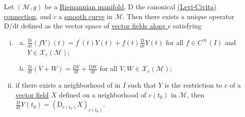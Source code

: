 \begin{proposition}\label{prop:covariant-derivative}
	Let \((\mathcal{M} , g)\) be a \hyperref[def:Riemannian-manifold]{Riemannian manifold}, \(\mathrm{D}\) the canonical \hyperref[def:Levi-Civita-connection]{(Levi-Civita) connection}, and \(c\) a \hyperref[def:curve]{smooth curve} in \(\mathcal{M} \). Then there exists a unique operator \(\mathrm{D} / \mathrm{d} t\) defined as the vector space of \hyperref[def:vector-field-along-curve]{vector fields along \(c\)} satisfying
	\begin{enumerate}[(i)]
		\item \label{prop:covariant-derivative-i}\begin{enumerate}[(a)]
			      \item \label{prop:covariant-derivative-i-a} \(\frac{\mathrm{D}}{\mathrm{d}t} (fY)(t) = f^\prime (t) Y(t) + f(t) \frac{\mathrm{D} }{\mathrm{d} t} Y(t)\) for all \(f\in C^{\infty} (I)\) and \(Y \in \mathcal{X} _c(\mathcal{M} )\);
			      \item \label{prop:covariant-derivative-i-b} \(\frac{\mathrm{D} }{\mathrm{d} t} (V+W) = \frac{\mathrm{D} V}{\mathrm{d} t} + \frac{\mathrm{D} W}{\mathrm{d} t}\) for all \(V, W\in \mathcal{X} _c(\mathcal{M} )\);
		      \end{enumerate}
		\item \label{prop:covariant-derivative-ii} if there exists a neighborhood of in \(I\) such that \(Y\) is the restriction to \(c\) of a \hyperref[def:vector-field]{vector field} \(X\) defined on a neighborhood of \(c(t_0)\) in \(\mathcal{M} \), then \(\frac{\mathrm{D} }{\mathrm{d} t} Y(t_0) = (\mathrm{D}_{c(t_0)} X) _{c(t_0)}\).
	\end{enumerate}
\end{proposition}
